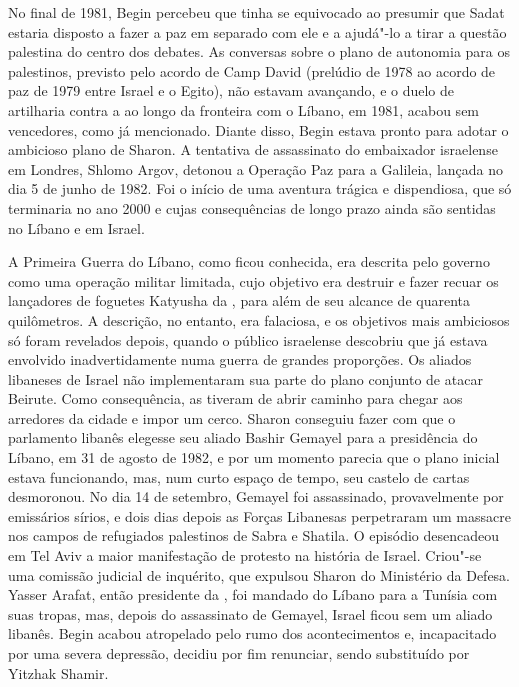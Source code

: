 No final de 1981, Begin percebeu que tinha se equivocado ao presumir que
Sadat estaria disposto a fazer a paz em separado com ele e a ajudá"-lo a
tirar a questão palestina do centro dos debates. As conversas sobre o
plano de autonomia para os palestinos, previsto pelo acordo de Camp
David (prelúdio de 1978 ao acordo de paz de 1979 entre Israel e o
Egito), não estavam avançando, e o duelo de artilharia contra a  ao
longo da fronteira com o Líbano, em 1981, acabou sem vencedores, como já
mencionado. Diante disso, Begin estava pronto para adotar o ambicioso
plano de Sharon. A tentativa de assassinato do embaixador israelense em
Londres, Shlomo Argov, detonou a Operação Paz para a Galileia, lançada
no dia 5 de junho de 1982. Foi o início de uma aventura trágica e
dispendiosa, que só terminaria no ano 2000 e cujas consequências de
longo prazo ainda são sentidas no Líbano e em Israel.

A Primeira Guerra do Líbano, como ficou conhecida, era descrita pelo
governo como uma operação militar limitada, cujo objetivo era destruir e
fazer recuar os lançadores de foguetes Katyusha da , para além de seu
alcance de quarenta quilômetros. A descrição, no entanto, era falaciosa,
e os objetivos mais ambiciosos só foram revelados depois, quando o
público israelense descobriu que já estava envolvido inadvertidamente
numa guerra de grandes proporções. Os aliados libaneses de Israel não
implementaram sua parte do plano conjunto de atacar Beirute. Como
consequência, as  tiveram de abrir caminho para chegar aos arredores
da cidade e impor um cerco. Sharon conseguiu fazer com que o parlamento
libanês elegesse seu aliado Bashir Gemayel para a presidência do Líbano,
em 31 de agosto de 1982, e por um momento parecia que o plano inicial
estava funcionando, mas, num curto espaço de tempo, seu castelo de cartas
desmoronou. No dia 14 de setembro, Gemayel foi assassinado,
provavelmente por emissários sírios, e dois dias depois as Forças
Libanesas perpetraram um massacre nos campos de refugiados palestinos de
Sabra e Shatila. O episódio desencadeou em Tel Aviv a maior manifestação de protesto
na história de Israel. Criou"-se uma comissão judicial de
inquérito, que expulsou Sharon do Ministério da Defesa. Yasser Arafat,
então presidente da , foi mandado do Líbano para a Tunísia com suas
tropas, mas, depois do assassinato de Gemayel, Israel ficou sem um aliado
libanês. Begin acabou atropelado pelo rumo dos acontecimentos e,
incapacitado por uma severa depressão, decidiu por fim renunciar, sendo
substituído por Yitzhak Shamir.

